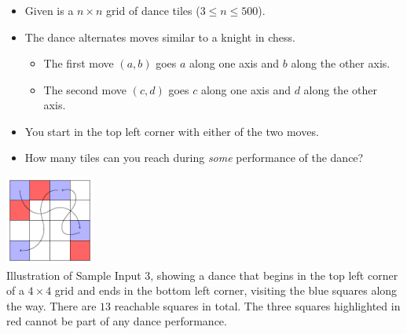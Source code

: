 \begin{frame}
  \frametitle{\problemtitle}

  \begin{itemize}
  \item Given is a $n\times n$ grid of dance tiles ($3\leq n\leq 500$).
  \item The dance alternates moves similar to a knight in chess.
    \begin{itemize}
  \item The first move $(a,b)$ goes $a$ along one axis and $b$ along the other axis.
  \item The second move $(c,d)$ goes $c$ along one axis and $d$ along the other axis.
    \end{itemize}
  \item You start in the top left corner with either of the two moves.
  \item How many tiles can you reach during \emph{some} performance of the dance?
  \end{itemize}

  \centering
  \includegraphics[width=0.22\textwidth]{figure} \\
  \small
  Illustration of Sample Input 3, showing a dance that begins in the top left corner of a $4\times 4$ grid and ends in the bottom left corner, visiting the blue squares along the way.
  There are $13$ reachable squares in total.
  The three squares highlighted in red cannot be part of any dance performance.

\end{frame}
